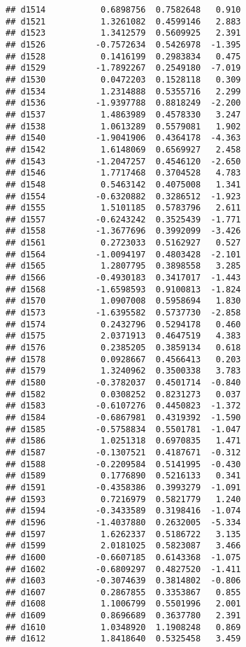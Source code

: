 \documentclass[
]{article}
\begin{document}
\begin{verbatim}
## d1514           0.6898756  0.7582648   0.910
## d1521           1.3261082  0.4599146   2.883
## d1523           1.3412579  0.5609925   2.391
## d1526          -0.7572634  0.5426978  -1.395
## d1528           0.1416199  0.2983834   0.475
## d1529          -1.7892267  0.2549180  -7.019
## d1530           0.0472203  0.1528118   0.309
## d1534           1.2314888  0.5355716   2.299
## d1536          -1.9397788  0.8818249  -2.200
## d1537           1.4863989  0.4578330   3.247
## d1538           1.0613289  0.5579081   1.902
## d1540          -1.9041906  0.4364178  -4.363
## d1542           1.6148069  0.6569927   2.458
## d1543          -1.2047257  0.4546120  -2.650
## d1546           1.7717468  0.3704528   4.783
## d1548           0.5463142  0.4075008   1.341
## d1554          -0.6320882  0.3286512  -1.923
## d1555           1.5101185  0.5783796   2.611
## d1557          -0.6243242  0.3525439  -1.771
## d1558          -1.3677696  0.3992099  -3.426
## d1561           0.2723033  0.5162927   0.527
## d1564          -1.0094197  0.4803428  -2.101
## d1565           1.2807795  0.3898558   3.285
## d1566          -0.4930183  0.3417017  -1.443
## d1568          -1.6598593  0.9100813  -1.824
## d1570           1.0907008  0.5958694   1.830
## d1573          -1.6395582  0.5737730  -2.858
## d1574           0.2432796  0.5294178   0.460
## d1575           2.0371913  0.4647519   4.383
## d1576           0.2385205  0.3859134   0.618
## d1578           0.0928667  0.4566413   0.203
## d1579           1.3240962  0.3500338   3.783
## d1580          -0.3782037  0.4501714  -0.840
## d1582           0.0308252  0.8231273   0.037
## d1583          -0.6107276  0.4450823  -1.372
## d1584          -0.6867981  0.4319392  -1.590
## d1585          -0.5758834  0.5501781  -1.047
## d1586           1.0251318  0.6970835   1.471
## d1587          -0.1307521  0.4187671  -0.312
## d1588          -0.2209584  0.5141995  -0.430
## d1589           0.1776890  0.5216133   0.341
## d1591          -0.4358386  0.3993279  -1.091
## d1593           0.7216979  0.5821779   1.240
## d1594          -0.3433589  0.3198416  -1.074
## d1596          -1.4037880  0.2632005  -5.334
## d1597           1.6262337  0.5186722   3.135
## d1599           2.0181025  0.5823087   3.466
## d1600          -0.6607185  0.6143368  -1.075
## d1602          -0.6809297  0.4827520  -1.411
## d1603          -0.3074639  0.3814802  -0.806
## d1607           0.2867855  0.3353867   0.855
## d1608           1.1006799  0.5501996   2.001
## d1609           0.8696689  0.3637780   2.391
## d1610           1.0348920  1.1908248   0.869
## d1612           1.8418640  0.5325458   3.459

\end{verbatim}
\end{document}
